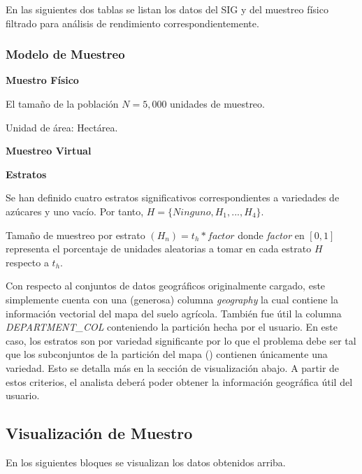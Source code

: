 \documentclass[conference]{IEEEtran}
\begin{document}
En las siguientes dos tablas se listan los datos del SIG y del muestreo físico filtrado para análisis de rendimiento correspondientemente.

\subsubsection{Modelo de Muestreo}

\textbf{Muestro Físico}

\bigbreak

El tamaño de la población $N = 5,000$ unidades de muestreo.

\bigbreak

Unidad de área: Hectárea.

\bigbreak

\textbf{Muestreo Virtual}

\bigbreak

\textbf{Estratos}

\bigbreak

Se han definido cuatro estratos significativos correspondientes a variedades de azúcares y uno vacío. Por tanto, $H = \{ Ninguno, H_1, ... , H_4 \}$.

\bigbreak

Tamaño de muestreo por estrato $(H_n) = t_h * factor$ donde \textit{factor} en $[0,1]$ representa el porcentaje de unidades aleatorias a tomar en cada estrato $H$ respecto a $t_h$.

\bigbreak

Con respecto al conjuntos de datos geográficos originalmente cargado, este simplemente cuenta con una (generosa) columna \textit{geography} la cual contiene la información vectorial del mapa del suelo agrícola. También fue útil la columna \textit{DEPARTMENT\_COL} conteniendo la partición hecha por el usuario. En este caso, los estratos son por variedad significante por lo que el problema debe ser tal que los subconjuntos de la partición del mapa () contienen únicamente una variedad. Esto se detalla más en la sección de visualización abajo. A partir de estos criterios, el analista deberá poder obtener la información geográfica útil del usuario.

\subsection{Visualización de Muestro}

En los siguientes bloques se visualizan los datos obtenidos arriba.
\end{document}
